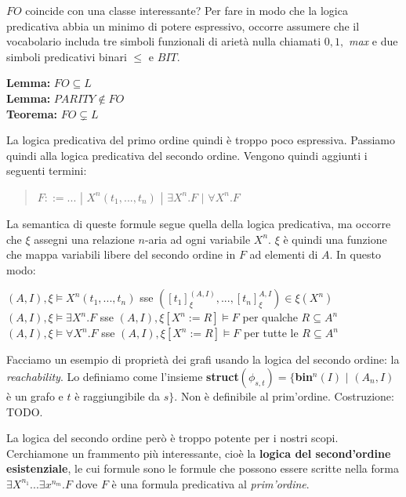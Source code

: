 \documentclass{article}
\begin{document}
\bigskip

$FO$ coincide con una classe interessante? Per fare in modo che la logica predicativa abbia un minimo di potere espressivo, occorre assumere che il vocabolario includa tre simboli funzionali di arietà nulla chiamati $0, 1,$ \textit{max} e due simboli predicativi binari $\leq$ e $BIT$.

\bigskip

\noindent\textbf{Lemma:} $FO\subseteq L$ \\
\textbf{Lemma:} $PARITY\not\in FO$ \\
\textbf{Teorema:} $FO\subsetneq L$

\bigskip

La logica predicativa del primo ordine quindi è troppo poco espressiva. Passiamo quindi alla logica predicativa del secondo ordine. Vengono quindi aggiunti i seguenti termini:
\begin{quote}
    $F::=...\,\,|\,\,X^n(t_1,...,t_n)\,\,|\,\,\exists X^n.F\,\,|\,\,\forall X^n.F$
\end{quote}
La semantica di queste formule segue quella della logica predicativa, ma occorre che $\xi$ assegni una relazione $n$-aria ad ogni variabile $X^n$. $\xi$ è quindi una funzione che mappa variabili libere del secondo ordine in $F$ ad elementi di $A$. In questo modo:

\noindent$(A,I),\xi\vDash X^n(t_1,...,t_n)$ sse $([t_1]_\xi^{(A,I)},...,[t_n]_\xi^{A,I})\in\xi(X^n)$ \\
$(A,I),\xi\vDash\exists X^n.F$ sse $(A,I),\xi[X^n:=R]\vDash F$ per qualche $R\subseteq A^n$ \\
$(A,I),\xi\vDash\forall X^n.F$ sse $(A,I),\xi[X^n:=R]\vDash F$ per tutte le $R\subseteq A^n$

\bigskip

\noindent Facciamo un esempio di proprietà dei grafi usando la logica del secondo ordine: la \textit{reachability}. Lo definiamo come l'insieme \textbf{struct}$(\phi_{s,t}) = \{$\textbf{bin}$^n(I)\,\,|\,\, (A_n,I)$ è un grafo e $t$ è raggiungibile da $s\}$. Non è definibile al prim'ordine. Costruzione: TODO.

\bigskip

La logica del secondo ordine però è troppo potente per i nostri scopi. Cerchiamone un frammento più interessante, cioè la \textbf{logica del second'ordine esistenziale}, le cui formule sono le formule che possono essere scritte nella forma $\exists X^{n_1}...\exists x^{n_m}.F$ dove $F$ è una formula predicativa al \textit{prim'ordine}.
\end{document}
